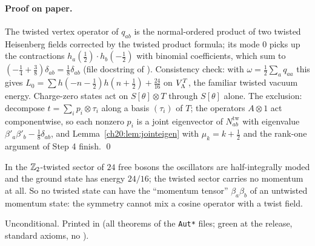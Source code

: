 \paragraph{Proof on paper.}  The twisted vertex operator of $q_{ab}$ is the normal-ordered product of two twisted
Heisenberg fields corrected by the twisted product formula; its mode $0$ picks up the contractions
$h_a(\tfrac12)\cdot h_b(-\tfrac12)$ with binomial coefficients, which sum to $(-\tfrac14+\tfrac38)\delta_{ab}=\tfrac18\delta_{ab}$
(file docstring of ).  Consistency check: with $\omega=\tfrac12\sum_aq_{aa}$ this gives
$L_0=\sum h(-n-\tfrac12)h(n+\tfrac12)+\tfrac{24}{16}$ on $V_{\Lambda}^T$, the familiar twisted vacuum energy.  Charge-zero
states act on $S[\theta]\otimes T$ through $S[\theta]$ alone.  The exclusion: decompose $t=\sum_ip_i\otimes\tau_i$ along a
basis $(\tau_i)$ of $T$; the operators $A\otimes1$ act componentwise, so each nonzero $p_i$ is a joint eigenvector of
$N^{\mathrm{tw}}_{ab}$ with eigenvalue $\beta'_a\beta'_b-\tfrac18\delta_{ab}$, and Lemma~\ref{ch20:lem:jointeigen} with
$\mu_k=k+\tfrac12$ and the rank-one argument of Step 4 finish. \qed
\begin{physics}
In the ${\mathbb{Z}}_2$-twisted sector of $24$ free bosons the oscillators are half-integrally moded and the ground state has
energy $24/16$; the twisted sector carries no momentum at all.  So no twisted state can have the ``momentum tensor''
$\beta_a\beta_b$ of an untwisted momentum state: the symmetry cannot mix a cosine operator with a twist field.
\end{physics}
\begin{status}
Unconditional.  Printed in  (all theorems of the \texttt{Aut*} files; green at the release, standard axioms, no ).
\end{status}

